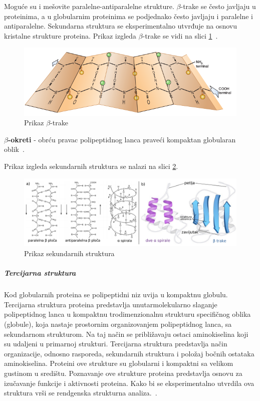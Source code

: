 Moguće su i mešovite paralelne-antiparalelne strukture.
$\beta$-trake se često javljaju u proteinima, a u globularnim proteinima se podjednako često javljaju i paralelne i antiparalelne. Sekundarna struktura se eksperimentalno utvrđuje na osnovu kristalne strukture proteina.
Prikaz izgleda $\beta$-trake se vidi na slici \ref{fig:beta}~\cite{spasic, Principi}.\\
\begin{figure}[h]
	\centering
    \includegraphics[width=1\textwidth]{Figures/BO/beta.png}
    \caption{Prikaz $\beta$-trake~\cite{bmbg}}
    \label{fig:beta}
\end{figure}
\textbf{$\beta$-okreti} - obrću pravac polipeptidnog lanca praveći kompaktan globularan oblik~\cite{lippincott}. 
 
Prikaz izgleda sekundarnih struktura se nalazi na slici \ref{fig:ab}.
\begin{figure}[h]
	\centering
    \includegraphics[width=1\textwidth]{Figures/BO/sec_structure.png}
    \caption{Prikaz sekundarnih struktura~\cite{Vinterhalter}}
    \label{fig:ab}
\end{figure}

\subparagraph{Tercijarna struktura}
Kod globularnih proteina se polipeptidni niz uvija u kompaktnu globulu. Tercijarna struktura proteina predstavlja unutarmolekularno slaganje polipeptidnog lanca u kompaktnu trodimenzionalnu strukturu specifičnog oblika (globule), koja nastaje prostornim organizovanjem polipeptidnog lanca, sa sekundarnom strukturom. Na taj način se približavaju ostaci aminokiselina koji su udaljeni u primarnoj strukturi. Tercijarna struktura predstavlja način organizacije, odnosno rasporeda, sekundarnih struktura i položaj bočnih ostataka aminokiselina. Proteini ove strukture su globularni i kompaktni sa velikom gustinom u središtu. Poznavanje ove strukture proteina predstavlja osnovu za izučavanje funkcije i aktivnosti proteina. Kako bi se eksperimentalno utvrdila ova struktura vrši se rendgenska strukturna analiza.~\cite{spasic, Principi,medbio}.


